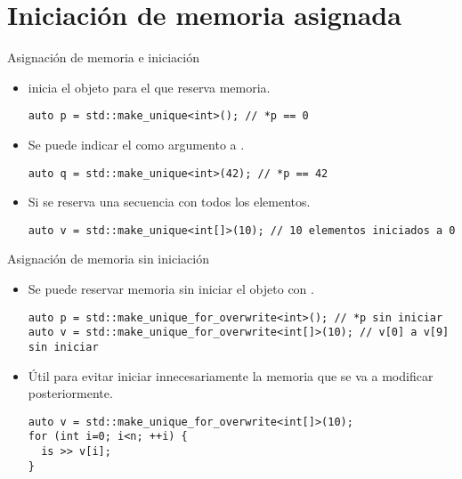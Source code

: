 \section{Iniciación de memoria asignada}

\begin{frame}[t,fragile]{Asignación de memoria e iniciación}
\begin{itemize}
  \item {} inicia el objeto para el que reserva memoria.
\begin{lstlisting}
auto p = std::make_unique<int>(); // *p == 0
\end{lstlisting}

  \item Se puede indicar el  como argumento a
        .
\begin{lstlisting}
auto q = std::make_unique<int>(42); // *p == 42
\end{lstlisting}

  \item Si se reserva una secuencia con  
         todos los elementos.
\begin{lstlisting}
auto v = std::make_unique<int[]>(10); // 10 elementos iniciados a 0
\end{lstlisting}
\end{itemize}
\end{frame}

\begin{frame}[t,fragile]{Asignación de memoria sin iniciación}
\begin{itemize}
  \item Se puede reservar memoria sin iniciar el objeto con
        .
\begin{lstlisting}
auto p = std::make_unique_for_overwrite<int>(); // *p sin iniciar
auto v = std::make_unique_for_overwrite<int[]>(10); // v[0] a v[9] sin iniciar
\end{lstlisting}

  \item Útil para evitar iniciar innecesariamente la memoria que se va a modificar
        posteriormente.
\begin{lstlisting}
auto v = std::make_unique_for_overwrite<int[]>(10);
for (int i=0; i<n; ++i) {
  is >> v[i];
}
\end{lstlisting}
\end{itemize}
\end{frame}

